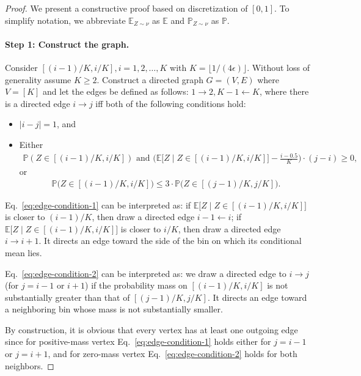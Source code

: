 \documentclass[11pt]{article}
\theoremstyle{statplain}
\theoremstyle{statdefinition}
\newcommand{\ra}{\rightarrow}
\newcommand{\la}{\leftarrow}
\newcommand{\E}{\mathbb{E}}
\newcommand{\PP}{\mathbb{P}}
\newcommand{\0}{\mathbf{0}}
\newcommand{\discreteNum}{K} %
\begin{document}
\begin{proof}
We present a constructive proof based on discretization of $[0,1]$. To simplify notation, we abbreviate $\E_{Z \sim \nu}$ as $\E$ and $\PP_{Z \sim \nu}$ as $\PP$.


\paragraph{Step 1: Construct the graph.}
Consider $[(i-1)/\discreteNum, i/\discreteNum], i = 1,2, \dots,\discreteNum$ with $\discreteNum = \lfloor 1/(4\epsilon) \rfloor$. Without loss of generality assume $\discreteNum\ge2$.
Construct a directed graph $G = (V,E)$ where $V = [\discreteNum]$ and let the edges be defined as follows: $1 \ra 2, \discreteNum-1 \la \discreteNum$, where there is a directed edge $i \ra j$ iff both of the following conditions hold:
\begin{itemize}
    \item $|i-j| = 1$, and
    \item Either \begin{align}\label{eq:edge-condition-1}
   \PP(Z\in [(i-1)/\discreteNum, i/\discreteNum]) \text{ and } \Big(\E\Big[Z\mid Z \in [(i-1)/\discreteNum, i/\discreteNum]\Big] - \frac{i-0.5}{\discreteNum}\Big) \cdot (j-i) \ge 0 ,
\end{align}
or 
\begin{align}\label{eq:edge-condition-2}
    \PP\Big(Z \in [(i-1)/\discreteNum, i/\discreteNum]\Big) \leq 3 \cdot \PP\Big(Z \in [(j-1)/\discreteNum, j/\discreteNum]\Big).
\end{align}
\end{itemize}

Eq.~\eqref{eq:edge-condition-1} can be interpreted as: if $\E\Big[Z\mid Z \in [(i-1)/\discreteNum, i/\discreteNum]\Big]$ is closer to $(i-1)/\discreteNum$, then draw a directed edge $i-1 \la i$; if $\E\Big[Z\mid Z \in [(i-1)/\discreteNum, i/\discreteNum]\Big]$ is closer to $i/\discreteNum$, then draw a directed edge $i \ra i+1$. It directs an edge toward the side of the bin on which its conditional mean lies.

Eq.~\eqref{eq:edge-condition-2} can be interpreted as: we draw a directed edge to $i \ra j$ (for $j = i-1$ or $i+1$) if the probability mass on $[(i-1)/\discreteNum, i/\discreteNum]$ is not substantially greater than that of $[(j-1)/\discreteNum, j/\discreteNum]$. It directs an edge toward a neighboring bin whose mass is not substantially smaller.

By construction, it is obvious that every vertex has at least one outgoing edge since for positive-mass vertex Eq.~\eqref{eq:edge-condition-1} holds either for $j = i-1$ or $j=i+1$, and for zero-mass vertex Eq.~\eqref{eq:edge-condition-2} holds for both neighbors.



\end{proof}
\end{document}
